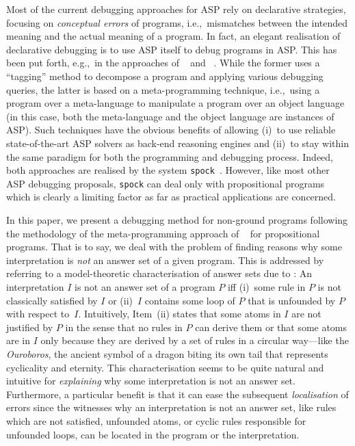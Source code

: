 \documentclass{tlp}
\newcommand{\wrt}{with respect to}
\newcommand{\iec}{i.e.,\ }
\newcommand{\egc}{e.g.,\ }
\begin{document}
Most of the current debugging approaches for ASP rely on declarative strategies, focusing on \emph{conceptual errors} of programs, \iec mismatches between the intended meaning and the actual meaning of a program.
In fact, an elegant realisation of declarative debugging is to use ASP itself to debug  programs in ASP. This has been put forth, \egc in the approaches of ~\citeyear{brain07} and ~\citeyear{gebser08}.
While the former uses a ``tagging'' method to decompose a program and applying various debugging queries, the latter is based on a meta-programming technique, \iec using a program over a meta-language to manipulate a program over an object language (in this case, both the meta-language and the object language are instances of ASP).
Such techniques have the obvious benefits of allowing (i)~to use reliable state-of-the-art ASP solvers as back-end reasoning engines and (ii)~to stay within the same paradigm for both the programming and debugging process.
Indeed, both approaches are realised by the system \texttt{spock}~\cite{spock07}.
However, like most other ASP debugging proposals, \texttt{spock} can deal only with propositional programs which is clearly a limiting factor as far as practical applications are concerned.

In this paper, we present a debugging method for non-ground programs following the methodology of the meta-programming approach of ~\citeyear{gebser08} for propositional programs.
That is to say, we deal with the problem of finding reasons why some interpretation is \emph{not} an answer set of a given program.
This is addressed by referring to a model-theoretic
characterisation of answer sets due to  \citeyear{lee05}:
An interpretation $I$ is not an answer set of a 
program $P$ iff
(i)~some rule in $P$ is not classically satisfied by $I$ or
(ii)~$I$ contains some loop of $P$ that is unfounded by  $P$ \wrt\ $I$.
Intuitively,  Item~(ii) states that some atoms in $I$ are not justified by $P$ in the  sense that
no rules in $P$ can derive them or that some atoms are in $I$ only because they are derived by a set of rules in a  circular way---like the \emph{Ouroboros}, the ancient symbol of a dragon biting its own tail that represents cyclicality and eternity.
This characterisation seems to be quite natural and intuitive for \emph{explaining}
why some interpretation is not an answer set. 
Furthermore, a particular 
benefit is that it can ease the subsequent  \emph{localisation} of errors
since the witnesses why an interpretation is not an answer set, like
rules which are not satisfied, unfounded atoms,  or cyclic rules  responsible for unfounded loops,
can be located in the program or the interpretation.
\end{document}
